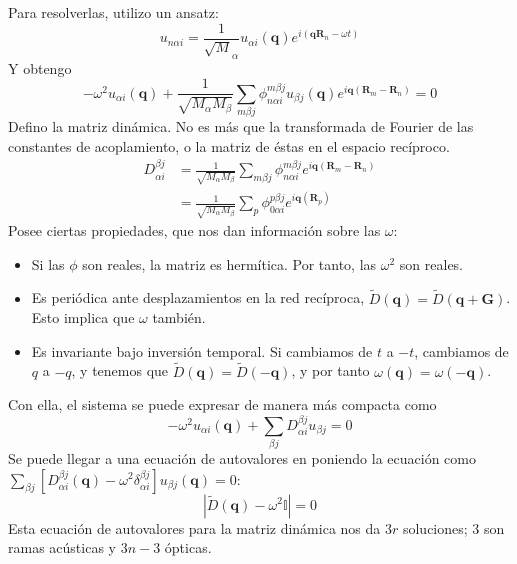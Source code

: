 Para resolverlas, utilizo un ansatz:
\begin{equation}
  u_{n\alpha i } = \frac{1}{\sqrt M_\alpha} u_{\alpha i} (\mathbf{q})
  e^{i(\mathbf{q}\mathbf{R}_n - \omega t)}
\end{equation}
Y obtengo
\begin{equation}
  -\omega^2 u_{\alpha i} (\mathbf{q}) + \frac{1}{\sqrt{M_\alpha
      M_\beta}}\sum_{m\beta j} \phi _{n\alpha i}^{m\beta j }u_{\beta j
  }(\mathbf{q}) e^{i \mathbf{q}(\mathbf{R}_m -\mathbf{R}_n )} = 0
\end{equation}
Defino la matriz dinámica. No es más que la transformada de Fourier de
las constantes de acoplamiento, o la matriz de éstas en el espacio recíproco.
\begin{equation}
\begin{split}
 D_{\alpha i }^{\beta j} &= \frac{1}{\sqrt{M_\alpha
      M_\beta}} \sum_{m\beta j} \phi _{n\alpha i}^{m\beta j } e^{i
    \mathbf{q}(\mathbf{R}_m -\mathbf{R}_n )} \\
&= \frac{1}{\sqrt{M_\alpha
      M_\beta}} \sum_{p} \phi _{0\alpha i}^{p\beta j } e^{i
    \mathbf{q}(\mathbf{R}_p)}
\end{split}
\end{equation}
Posee ciertas propiedades, que nos dan información sobre las $\omega$:
\begin{itemize}
\item Si las $\phi$ son reales, la matriz es hermítica. Por tanto, las
  $\omega^2$ son reales.
\item Es periódica ante desplazamientos en la red recíproca, $\tilde D
  (\mathbf{q}) = \tilde D (\mathbf{q} + \mathbf{G})$. Esto implica que
  $\omega$ también.
\item Es invariante bajo inversión temporal. Si cambiamos de $t$ a
  $-t$, cambiamos de $q$ a $-q$, y tenemos que $\tilde D (\mathbf{q})
  = \tilde D (\mathbf{-q})$, y por tanto $\omega (\mathbf{q}) = \omega (\mathbf{-q})$.
\end{itemize}
Con ella, el sistema se puede expresar de manera más compacta como
\begin{equation}
  \boxed{
    -\omega^2 u_{\alpha i} (\mathbf{q}) + \sum_{\beta j} D_{\alpha
      i}^{\beta j} u_{\beta j} = 0
  }
\end{equation}
Se puede llegar a una ecuación de autovalores en poniendo la ecuación
como $\sum_{\beta j} \left[ D_{\alpha i}^{\beta j} (\mathbf{q})  -
  \omega^2 \delta_{\alpha i }^{\beta j}\right] u_{\beta j} (
\mathbf{q}) = 0$:
\begin{equation}
  | \tilde D ( \mathbf{q}) - \omega^2 \mathbb{I} | = 0
\end{equation}
Esta ecuación de autovalores para la matriz dinámica nos da $3r$
soluciones; $3$ son ramas acústicas y $3n - 3$ ópticas.

